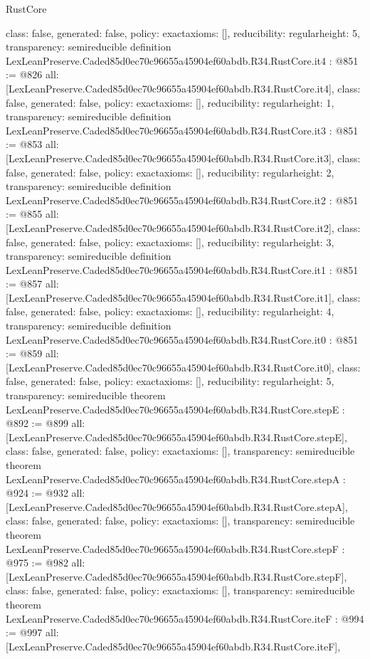 \begin{lexlean}{RustCore}
\begin{coremodule}
{  class: false,
  generated: false,
  policy: exact{axioms: []},
  reducibility: regular{height: 5},
  transparency: semireducible
}
definition LexLeanPreserve.Caded85d0ec70c96655a45904ef60abdb.R34.RustCore.it4 : @851 := @826 {
  all: [LexLeanPreserve.Caded85d0ec70c96655a45904ef60abdb.R34.RustCore.it4],
  class: false,
  generated: false,
  policy: exact{axioms: []},
  reducibility: regular{height: 1},
  transparency: semireducible
}
definition LexLeanPreserve.Caded85d0ec70c96655a45904ef60abdb.R34.RustCore.it3 : @851 := @853 {
  all: [LexLeanPreserve.Caded85d0ec70c96655a45904ef60abdb.R34.RustCore.it3],
  class: false,
  generated: false,
  policy: exact{axioms: []},
  reducibility: regular{height: 2},
  transparency: semireducible
}
definition LexLeanPreserve.Caded85d0ec70c96655a45904ef60abdb.R34.RustCore.it2 : @851 := @855 {
  all: [LexLeanPreserve.Caded85d0ec70c96655a45904ef60abdb.R34.RustCore.it2],
  class: false,
  generated: false,
  policy: exact{axioms: []},
  reducibility: regular{height: 3},
  transparency: semireducible
}
definition LexLeanPreserve.Caded85d0ec70c96655a45904ef60abdb.R34.RustCore.it1 : @851 := @857 {
  all: [LexLeanPreserve.Caded85d0ec70c96655a45904ef60abdb.R34.RustCore.it1],
  class: false,
  generated: false,
  policy: exact{axioms: []},
  reducibility: regular{height: 4},
  transparency: semireducible
}
definition LexLeanPreserve.Caded85d0ec70c96655a45904ef60abdb.R34.RustCore.it0 : @851 := @859 {
  all: [LexLeanPreserve.Caded85d0ec70c96655a45904ef60abdb.R34.RustCore.it0],
  class: false,
  generated: false,
  policy: exact{axioms: []},
  reducibility: regular{height: 5},
  transparency: semireducible
}
theorem LexLeanPreserve.Caded85d0ec70c96655a45904ef60abdb.R34.RustCore.stepE : @892 := @899 {
  all: [LexLeanPreserve.Caded85d0ec70c96655a45904ef60abdb.R34.RustCore.stepE],
  class: false,
  generated: false,
  policy: exact{axioms: []},
  transparency: semireducible
}
theorem LexLeanPreserve.Caded85d0ec70c96655a45904ef60abdb.R34.RustCore.stepA : @924 := @932 {
  all: [LexLeanPreserve.Caded85d0ec70c96655a45904ef60abdb.R34.RustCore.stepA],
  class: false,
  generated: false,
  policy: exact{axioms: []},
  transparency: semireducible
}
theorem LexLeanPreserve.Caded85d0ec70c96655a45904ef60abdb.R34.RustCore.stepF : @975 := @982 {
  all: [LexLeanPreserve.Caded85d0ec70c96655a45904ef60abdb.R34.RustCore.stepF],
  class: false,
  generated: false,
  policy: exact{axioms: []},
  transparency: semireducible
}
theorem LexLeanPreserve.Caded85d0ec70c96655a45904ef60abdb.R34.RustCore.iteF : @994 := @997 {
  all: [LexLeanPreserve.Caded85d0ec70c96655a45904ef60abdb.R34.RustCore.iteF],
}
\end{coremodule}
\end{lexlean}
